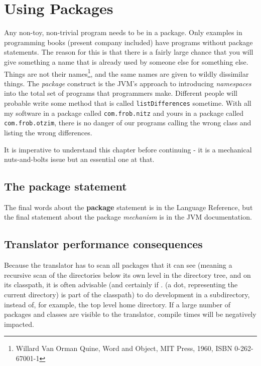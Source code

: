 {{\chapter{Using Packages}
Any non-toy, non-trivial program needs to be in a package. Only
examples in programming books (present company included) have programs
without package statements. The reason
for this is that there is a fairly large chance that you will give
something a name that is already used by someone else for something
else. Things are not their names\footnote{Willard Van Orman Quine, Word
  and Object, MIT Press, 1960, ISBN 0-262-67001-1}, and the same names
are given to wildly dissimilar things. The \emph{package} construct is the JVM's approach to
introducing \emph{namespaces} into the total set of programs that
programmers make. Different people will probable write some method that is
called \texttt{listDifferences} sometime. With all my software in a
package called \texttt{com.frob.nitz} and yours in a package
called \texttt{com.frob.otzim}, there is no danger of our programs
calling the wrong class and listing the wrong differences.

It is imperative to understand this chapter before continuing - it is
a mechanical nuts-and-bolts issue but an essential one at that.

\section{The package statement}
The final words about the \nr{} \textbf{package} statement is in the
\nr{} Language Reference, but the final statement about the package
\emph{mechanism} is in the JVM documentation.
\section{Translator performance consequences}
Because the \nr{} translator has to scan all packages that it can
see (meaning a recursive scan of the directories below its own level
in the directory tree, and on its classpath, it is often advisable
(and certainly if . (a dot, representing the current directory) is part of the classpath)
to do development in a subdirectory, instead of, for example, the top
level home directory. If a large number of packages and classes are
visible to the translator, compile times will be negatively impacted. 

}}
